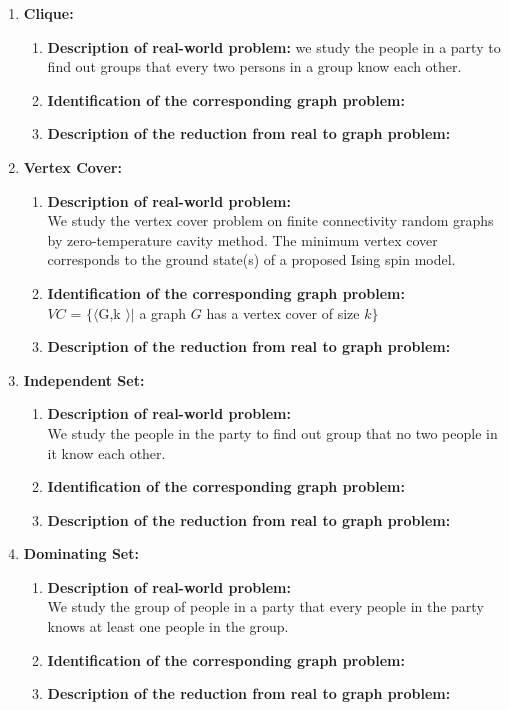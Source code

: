 \documentclass[article, 10pt,onecolumn]{article}
\begin{document}
\begin{enumerate}
\item \textbf{Clique:}
 \begin{enumerate}
   \item \textbf{Description of real-world problem:} 
   we study the people in a party to find out groups that every two persons in a group know each other. 
   \item \textbf{Identification of the corresponding graph problem:} 
   
   \item \textbf{Description of the reduction from real to graph problem:} 
  \end{enumerate}
  
\item \textbf{Vertex Cover:}
  \begin{enumerate}
   \item \textbf{Description of real-world problem:}\\
    We study the vertex cover problem on finite connectivity random graphs by zero-temperature cavity method. The minimum vertex cover
    corresponds to the ground state(s) of a proposed Ising spin model.\cite{Vertex}
   \item \textbf{Identification of the corresponding graph problem:}\\
    $VC$ = $\{\langle $G,k $ \rangle | $ a graph $G$ has a vertex cover of size $k\}$ \\
   \item \textbf{Description of the reduction from real to graph problem:} 
  \end{enumerate}

\item \textbf{Independent Set:}
 \begin{enumerate}
   \item \textbf{Description of real-world problem:} \\
   	We study the people in the party to find out group that no two people in it know each other.
   \item \textbf{Identification of the corresponding graph problem:} 
   \item \textbf{Description of the reduction from real to graph problem:} 
  \end{enumerate}
  
\item \textbf{Dominating Set:}
 \begin{enumerate}
   \item \textbf{Description of real-world problem:}\\ 
   We study the group of people in a party that every people in the party knows at least one people in the group. 
   \item \textbf{Identification of the corresponding graph problem:} 
   \item \textbf{Description of the reduction from real to graph problem:} 
  \end{enumerate}
  

\end{enumerate}
\end{document}

